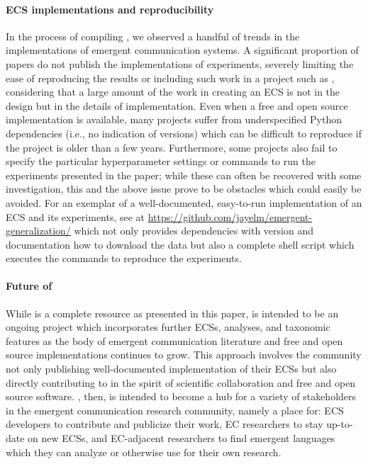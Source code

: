 \paragraph{ECS implementations and reproducibility}
In the process of compiling \theLib{}, we observed a handful of trends in the implementations of emergent communication systems.
A significant proportion of papers do not publish the implementations of experiments, severely limiting the ease of reproducing the results or including such work in a project such as \theLib{}, considering that a large amount of the work in creating an ECS is not in the design but in the details of implementation.
Even when a free and open source implementation is available, many projects suffer from underspecified Python dependencies (i.e., no indication of versions) which can be difficult to reproduce if the project is older than a few years.
Furthermore, some projects also fail to specify the particular hyperparameter settings or commands to run the experiments presented in the paper; while these can often be recovered with some investigation, this and the above issue prove to be obstacles which could easily be avoided.
For an exemplar of a well-documented, easy-to-run implementation of an ECS and its experiments, see \citet{mu2021generalizations} at \url{https://github.com/jayelm/emergent-generalization/} which not only provides dependencies with version and documentation how to download the data but also a complete shell script which executes the commands to reproduce the experiments.


\paragraph{Future of \theLib{}}
While \theLib{} is a complete resource as presented in this paper, \theLib{} is intended to be an ongoing project which incorporates further ECSs, analyses, and taxonomic features as the body of emergent communication literature and free and open source implementations continues to grow.
This approach involves the community not only publishing well-documented implementation of their ECSs but also directly contributing to \theLib{} in the spirit of scientific collaboration and free and open source software.
\theLib{}, then, is intended to become a hub for a variety of stakeholders in the emergent communication research community, namely a place for:
  ECS developers to contribute and publicize their work,
  EC researchers to stay up-to-date on new ECSs,
  and EC-adjacent researchers to find emergent languages which they can analyze or otherwise use for their own research.


